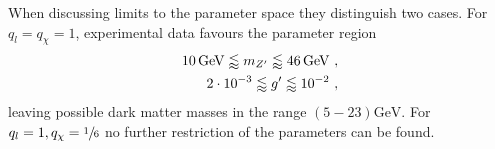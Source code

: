 When discussing limits to the parameter space they distinguish two cases. For $q_l=q_\chi=1$, experimental data favours the parameter region
\begin{align}\label{eq:Boundg}
	\SI{10}{\giga\electronvolt}\lessapprox m_{Z'}\lessapprox\SI{46}{\giga\electronvolt} \ , \notag \\
	\SI{2e-3}{}\lessapprox g'\lessapprox\SI{e-2}{} \ ,
\end{align}
leaving possible dark matter masses in the range $(5-23)\si{\giga\electronvolt}$. For $q_l=1,q_\chi=\sfrac{1}{6}$ no further restriction of the parameters can be found.

